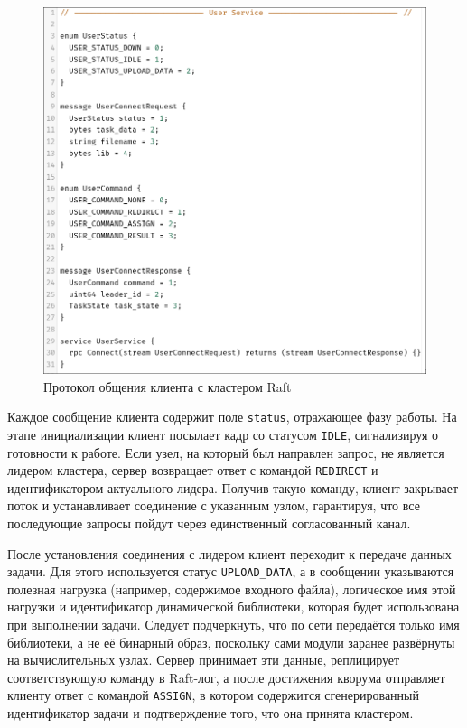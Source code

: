 \begin{figure}
  \centering
  \includegraphics[scale=0.4]{inc/user-proto.png}
  \caption{Протокол общения клиента с кластером Raft}
  \label{fig:client_config}
\end{figure}

Каждое сообщение клиента содержит поле \texttt{status}, отражающее фазу работы.
На этапе инициализации клиент посылает кадр со статусом \texttt{IDLE},
сигнализируя о готовности к работе. Если узел, на который был направлен запрос,
не является лидером кластера, сервер возвращает ответ с командой \texttt{REDIRECT}
и идентификатором актуального лидера. Получив такую команду, клиент закрывает
поток и устанавливает соединение с указанным узлом, гарантируя, что все
последующие запросы пойдут через единственный согласованный канал.

После установления соединения с лидером клиент переходит к передаче данных
задачи. Для этого используется статус \texttt{UPLOAD\_DATA}, а в сообщении
указываются полезная нагрузка (например, содержимое входного файла),
логическое имя этой нагрузки и идентификатор динамической библиотеки, которая
будет использована при выполнении задачи. Следует подчеркнуть, что по сети
передаётся только имя библиотеки, а не её бинарный образ, поскольку сами
модули заранее развёрнуты на вычислительных узлах. Сервер принимает эти данные,
реплицирует соответствующую команду в Raft-лог, а после достижения кворума
отправляет клиенту ответ с командой \texttt{ASSIGN}, в котором содержится
сгенерированный идентификатор задачи и подтверждение того, что она принята
кластером.

